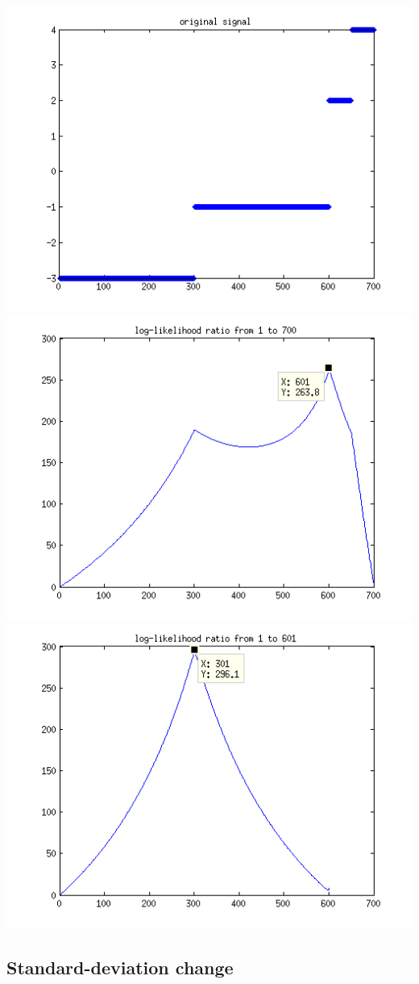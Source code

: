 \documentclass[11pt]{article}
\begin{document}
\includegraphics{stopmean0}
\hspace*{-5.3cm}\includegraphics[width=0.89\linewidth]{stopmean1}
\includegraphics[width=0.89\linewidth]{stopmean2}

\subsection{Standard-deviation change}

  
\end{document}
